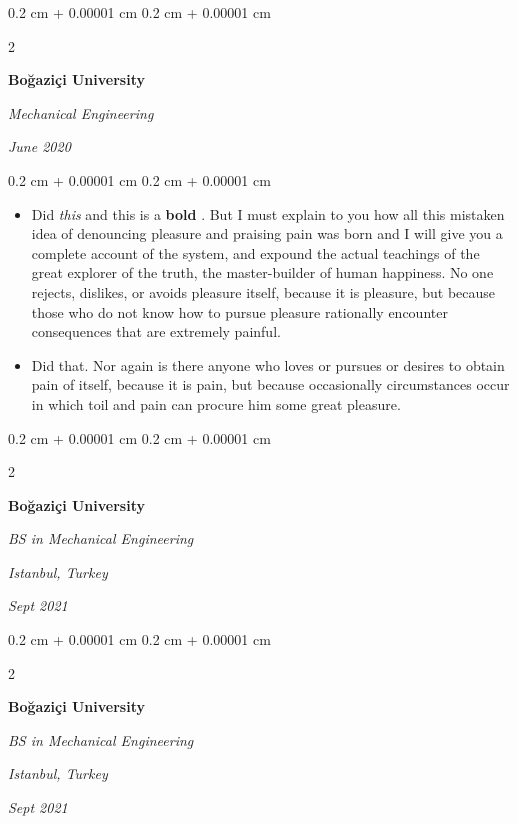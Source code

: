 \documentclass[10pt, letterpaper]{article}
\newenvironment{highlights}{
    \begin{itemize}[
        topsep=0.10 cm,
        parsep=0.10 cm,
        partopsep=0pt,
        itemsep=0pt,
        leftmargin=0.4 cm + 10pt
    ]
}{
    \end{itemize}
} %
\newenvironment{onecolentry}{
    \begin{adjustwidth}{
        0.2 cm + 0.00001 cm
    }{
        0.2 cm + 0.00001 cm
    }
}{
    \end{adjustwidth}
} %
\newenvironment{twocolentry}[2][]{
    \onecolentry
    \def\secondColumn{#2}
    \setcolumnwidth{\fill, 4.5 cm}
    \begin{paracol}{2}
}{
    \switchcolumn \raggedleft \secondColumn
    \end{paracol}
    \endonecolentry
} %
\let\hrefWithoutArrow\href
\renewcommand{\href}[2]{\hrefWithoutArrow{#1}{\ifthenelse{\equal{#2}{}}{ }{#2 }\raisebox{.15ex}{\footnotesize \faExternalLink*}}}
\begin{document}
        \vspace{0.2 cm}

        \begin{twocolentry}{
            
            
        \textit{June 2020}}
            \textbf{Boğaziçi University}

            \textit{Mechanical Engineering}
        \end{twocolentry}

        \vspace{0.10 cm}
        \begin{onecolentry}
            \begin{highlights}
                \item Did \textit{this} and this is a \textbf{bold} \href{https://example.com}{link}. But I must explain to you how all this mistaken idea of denouncing pleasure and praising pain was born and I will give you a complete account of the system, and expound the actual teachings of the great explorer of the truth, the master-builder of human happiness. No one rejects, dislikes, or avoids pleasure itself, because it is pleasure, but because those who do not know how to pursue pleasure rationally encounter consequences that are extremely painful.
                \item Did that. Nor again is there anyone who loves or pursues or desires to obtain pain of itself, because it is pain, but because occasionally circumstances occur in which toil and pain can procure him some great pleasure.
            \end{highlights}
        \end{onecolentry}


        \vspace{0.2 cm}

        \begin{twocolentry}{
        \textit{Istanbul, Turkey}    
            
        \textit{Sept 2021}}
            \textbf{Boğaziçi University}

            \textit{BS in Mechanical Engineering}
        \end{twocolentry}



        \vspace{0.2 cm}

        \begin{twocolentry}{
        \textit{Istanbul, Turkey}    
            
        \textit{Sept 2021}}
            \textbf{Boğaziçi University}

            \textit{BS in Mechanical Engineering}
        \end{twocolentry}
\end{document}

